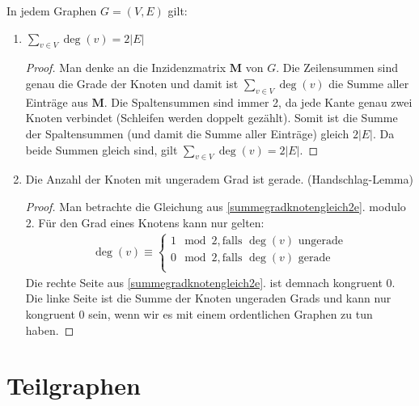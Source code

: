 \documentclass[%
a4paper, %
9pt,              %
leqno,            %
fleqn,            %
]
{scrartcl}
\begin{document}
In jedem Graphen $G = (V,E)$ gilt:
\begin{enumerate}
  \item $\sum\limits_{v \in V} \deg(v) = 2 |E|$\label{summegradknotengleich2e}
    \begin{proof}
      Man denke an die Inzidenzmatrix $\mathbf{M}$ von $G$. Die Zeilensummen
      sind genau die Grade der Knoten und damit ist $\sum\limits_{v \in V}
      \deg(v)$ die Summe aller Einträge aus $\mathbf{M}$. Die Spaltensummen sind
      immer 2, da jede Kante genau zwei Knoten verbindet (Schleifen werden
      doppelt gezählt). Somit ist die Summe der Spaltensummen (und damit die
      Summe aller Einträge) gleich $2|E|$. Da beide Summen gleich sind, gilt
      $\sum\limits_{v \in V} \deg(v) = 2 |E|$.
    \end{proof}
  \item Die Anzahl der Knoten mit ungeradem Grad ist gerade. \hfill
    (Handschlag-Lemma)
    \begin{proof}
      Man betrachte die Gleichung aus \ref{summegradknotengleich2e}. modulo 2.
      Für den Grad eines Knotens kann nur gelten:
      \begin{align*}
        \deg(v) \equiv
          \begin{cases}
            1 \mod 2, \text{falls $\deg(v)$ ungerade}\\
            0 \mod 2, \text{falls $\deg(v)$ gerade}\\
          \end{cases}
      \end{align*}
      Die rechte Seite aus \ref{summegradknotengleich2e}. ist demnach kongruent
      $0$. Die linke Seite ist die Summe der Knoten ungeraden Grads und kann nur
      kongruent $0$ sein, wenn wir es mit einem ordentlichen Graphen zu tun
      haben.
    \end{proof}
\end{enumerate}




\section*{Teilgraphen} %
\label{sec:Teilgraphen}
\end{document}
